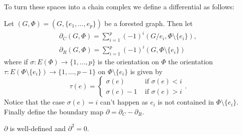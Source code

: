 To turn these spaces into a chain complex we define a differential as follows:
\begin{definition}
	Let $(G,\Phi) = (G, \{e_1,\ldots,e_{p}\} )$ be a forested graph. Then let
	\begin{align*}
		\partial_{C}(G,\Phi) = \sum_{i=1}^{p} (-1)^{i} (G / e_{i}, \Phi \setminus \{e_i\}),\\
		\partial _{R}(G,\Phi) = \sum_{i=1}^{p} (-1)^{i} (G,\Phi \setminus \{e_{i}\}) 
	\end{align*}
	where if $\sigma: E(\Phi) \to \{1,\ldots,p\} $ is the orientation on $\Phi$ the orientation $\tau: E(\Phi \setminus \{e_{i}\}) \to \{1,\ldots,p-1\} $ 
	on $\Phi \setminus \{e_{i}\}$ is given by 
	\[
		\tau(e) = \begin{cases}
			\sigma(e) & \text{ if }\sigma(e) < i\\
			\sigma(e) - 1 & \text{ if } \sigma(e) > i
		\end{cases}
	.\]
	Notice that the case $\sigma(e) = i$ can't happen as $e_{i}$ is not contained in $\Phi \setminus \{e_{i}\}$. 
	Finally define the boundary map $\partial = \partial_{C} - \partial_{R}$.
\end{definition}

\begin{proposition}
	$\partial$ is well-defined and $\partial^2 = 0$.
\end{proposition}

